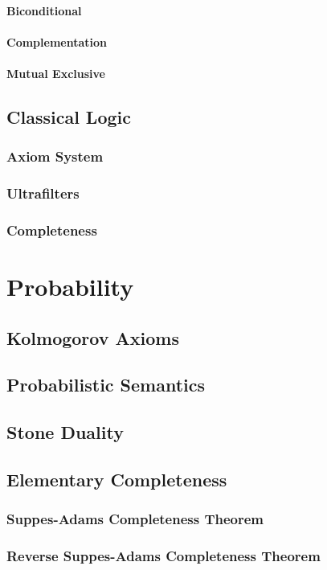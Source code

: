 \documentclass[a4paper,11pt]{book}
\begin{document}
\subsubsection{Biconditional}
\subsubsection{Complementation}
\subsubsection{Mutual Exclusive}
\section{Classical Logic}
\subsection{Axiom System}
\subsection{Ultrafilters}
\subsection{Completeness}
  
\chapter{Probability}
\section{Kolmogorov Axioms}
\section{Probabilistic Semantics}
\section{Stone Duality}
\section{Elementary Completeness}
\subsection{Suppes-Adams Completeness Theorem}
\subsection{Reverse Suppes-Adams Completeness Theorem}
\end{document}
